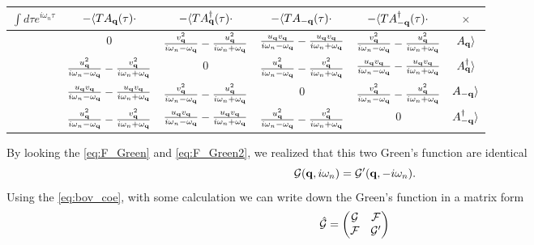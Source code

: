 \begin{center}
{\Large
\begin{fullwidth}
\begin{tabular}{||c|c|c|c|c|c||}
    \hline
    $\int d\tau e^{i\omega_n \tau}$ & $-\langle T A_{\mathbf{q}}(\tau) \cdot$ & $ -\langle T A_{\mathbf{q}}^\dagger(\tau) \cdot$ & $-\langle T A_{-\mathbf{q}}(\tau) \cdot$ & $ -\langle T A_{-\mathbf{q}}^\dagger(\tau) \cdot$ & $\times$ \\
    \hline
    ~ & $0$ &  \textcolor{NavyBlue}{$\frac{v_{\mathbf{q}}^2}{i\omega_n -\omega_{\mathbf{q}}} - \frac{u_{\mathbf{q}}^2}{i\omega_n+\omega_{\mathbf{q}}}$} & $\frac{u_{\mathbf{q}} v_{\mathbf{q}}}{i\omega_n-\omega_{\mathbf{q}}} - \frac{u_{\mathbf{q}} v_{\mathbf{q}}}{i\omega_n + \omega_{\mathbf{q}}}$ & \textcolor{NavyBlue}{$\frac{v_{\mathbf{q}}^2}{i\omega_n -\omega_{\mathbf{q}}} - \frac{u^2_{\mathbf{q}}}{i\omega_n+\omega_{\mathbf{q}}}$} & $A_{\mathbf{q}}\rangle$ \\
    \hline
    ~ & \textcolor{OliveGreen}{$\frac{u_{\mathbf{q}}^2}{i\omega_n-\omega_{\mathbf{q}}} - \frac{v_{\mathbf{q}}^2}{i\omega_n+\omega_{\mathbf{q}}}$} & $0$ & \textcolor{OliveGreen}{$\frac{u_{\mathbf{q}}^2}{i\omega_n-\omega_{\mathbf{q}}} - \frac{v_{\mathbf{q}}^2}{i\omega_n+\omega_{\mathbf{q}}}$} & $\frac{u_{\mathbf{q}} v_{\mathbf{q}}}{i\omega_n - \omega_{\mathbf{q}}} - \frac{u_{\mathbf{q}} v_{\mathbf{q}}}{i\omega_n + \omega_{\mathbf{q}}}$ & $A_{\mathbf{q}}^\dagger \rangle$ \\
    \hline
    ~ & $\frac{u_{\mathbf{q}} v_{\mathbf{q}}}{i\omega_n-\omega_{\mathbf{q}}} - \frac{u_{\mathbf{q}} v_{\mathbf{q}}}{i\omega_n + \omega_{\mathbf{q}}}$ & \textcolor{NavyBlue}{$\frac{v_{\mathbf{q}}^2}{i\omega_n -\omega_{\mathbf{q}}} - \frac{u_{\mathbf{q}}^2}{i\omega_n+\omega_{\mathbf{q}}}$} & $0$ & \textcolor{NavyBlue}{$\frac{v_{\mathbf{q}}^2}{i\omega_n -\omega_{\mathbf{q}}} - \frac{u^2_{\mathbf{q}}}{i\omega_n+\omega_{\mathbf{q}}}$} & $A_{-\mathbf{q}}\rangle$ \\
    \hline
    ~ & \textcolor{OliveGreen}{$\frac{u_{\mathbf{q}}^2}{i\omega_n-\omega_{\mathbf{q}}} - \frac{v_{\mathbf{q}}^2}{i\omega_n+\omega_{\mathbf{q}}}$} & $\frac{u_{\mathbf{q}} v_{\mathbf{q}}}{i\omega_n-\omega_{\mathbf{q}}} - \frac{u_{\mathbf{q}} v_{\mathbf{q}}}{i\omega_n + \omega_{\mathbf{q}}}$ & \textcolor{OliveGreen}{$\frac{u_{\mathbf{q}}^2}{i\omega_n-\omega_{\mathbf{q}}} - \frac{v_{\mathbf{q}}^2}{i\omega_n+\omega_{\mathbf{q}}}$} & $0$ & $A^\dagger_{-\mathbf{q}} \rangle$\\
    \hline
\end{tabular}
\end{fullwidth}
}
\end{center}

By looking the \eqref{eq:F_Green} and \eqref{eq:F_Green2}, we realized that this two Green's function are identical
\begin{equation}
  \mathcal{G}(\mathbf{q},i\omega_n) = \mathcal{G}'(\mathbf{q},-i\omega_n) \label{eq:F_Green_realition}.
\end{equation}
Using the \eqref{eq:bov_coe}, with some calculation we can write down the Green's function in a matrix form~\cite{Christensen2015}
\begin{equation}
\hat{\mathcal{G}}=
  \begin{pmatrix}
    \mathcal{G} & \mathcal{F} \\
    \mathcal{F} & \mathcal{G}'
  \end{pmatrix}
\end{equation}

